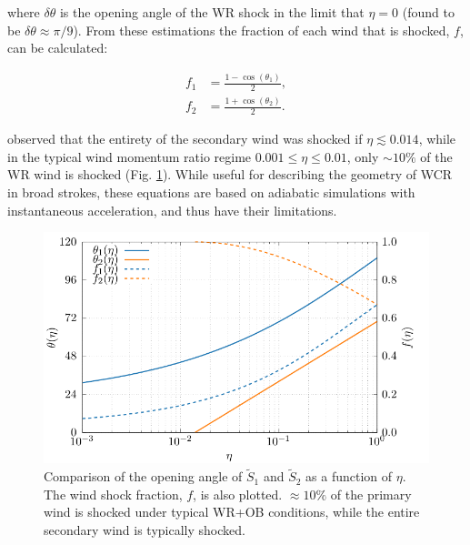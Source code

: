 \noindent
where $\delta \theta$ is the opening angle of the WR shock in the limit that $\eta = 0$ (found to be $\delta \theta \approx \pi/9$).
From these estimations the fraction of each wind that is shocked, $f$, can be calculated:

\begin{subequations}
  \label{eq:windshockfraction}
  \begin{align}
    f_1 & = \frac{1 - \cos\left(\theta_1\right)}{2} , \\
    f_2 & = \frac{1 + \cos\left(\theta_2\right)}{2} .
  \end{align}
\end{subequations}

\noindent
\textcite{pittardCollidingStellarWinds2018} observed that the entirety of the secondary wind was shocked if $\eta \lesssim 0.014$, while in the typical wind momentum ratio regime $0.001 \leq \eta \leq 0.01$, only $\sim 10\%$ of the WR wind is shocked (Fig. \ref{fig:wind-shock-factor}).
While useful for describing the geometry of WCR in broad strokes, these equations are based on adiabatic simulations with instantaneous acceleration, and thus have their limitations.

\begin{figure}[ht]
  \centering
  \includegraphics{assets/wind-shock-factor/shock-factor.pdf}
  \caption[Wind shock fraction, as a function of $\eta$]{Comparison of the opening angle of $\widetilde{S}_1$ and $\widetilde{S}_2$ as a function of $\eta$. The wind shock fraction, $f$, is also plotted. $\approx 10\%$ of the primary wind is shocked under typical WR+OB conditions, while the entire secondary wind is typically shocked.}
  \label{fig:wind-shock-factor}
\end{figure}

